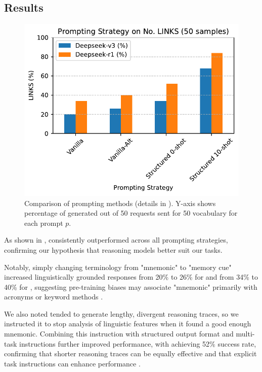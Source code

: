 \subsection{Results} \label{sec:icl-results}

\begin{figure}[htb]
  \centering
  \includegraphics[width=\linewidth]{figures/prompt_comparison.pdf}
  \caption{Comparison of prompting methods (details in ). Y-axis shows percentage of \lgms generated out of 50 requests sent for 50 vocabulary \vocab for each prompt $p$.}
  \label{fig:prompting-methods}
\end{figure}

As shown in , \teachermodel consistently outperformed \xteachermodel across all prompting strategies, confirming our hypothesis that reasoning models better suit our tasks.

Notably, simply changing terminology from "mnemonic" to "memory cue" increased linguistically grounded responses from 20\% to 26\% for \xteachermodel and from 34\% to 40\% for \teachermodel, suggesting pre-training biases may associate "mnemonic" primarily with acronyms or keyword methods \citep{hackmannWordImportanceExplains2024}.

We also noted \teachermodel tended to generate lengthy, divergent reasoning traces, so we instructed it to stop analysis of linguistic features when it found a good enough mnemonic. Combining this instruction with structured output format and multi-task instructions further improved performance, with \teachermodel achieving 52\% success rate, confirming that shorter reasoning traces can be equally effective \citep{xuChainDraftThinking2025} and that explicit task instructions can enhance performance \citep{yinDidYouRead2023}.


